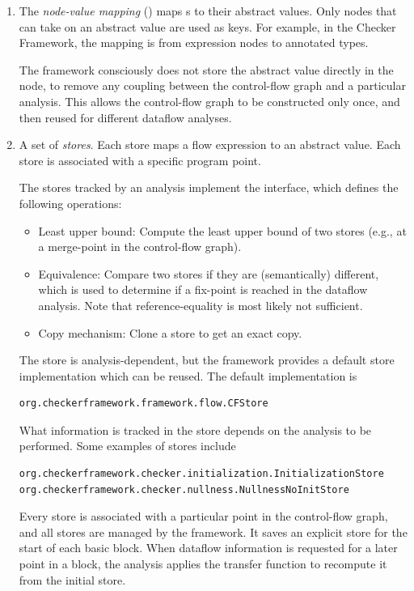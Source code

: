 \begin{enumerate}
\item
The \emph{node-value mapping} () maps s to their abstract
values.  Only nodes that can take on an abstract value are
used as keys.  For example, in the Checker Framework, the mapping is
from expression nodes to annotated types.

The framework consciously does not store the abstract value
directly in the node, to remove any coupling between the control-flow
graph and a particular analysis.  This allows the control-flow graph
to be constructed only once, and then reused for different dataflow
analyses.

\item
A set of \emph{stores}.  Each store maps a flow expression to an
abstract value.  Each store is associated with a specific program point.

The stores tracked by an analysis implement the 
interface, which defines the following operations:
\begin{itemize}
\item Least upper bound: Compute the least upper bound of two stores
  (e.g., at a merge-point in the control-flow graph).
\item Equivalence: Compare two stores if they are (semantically)
  different, which is used to determine if a fix-point is reached in
  the dataflow analysis. Note that reference-equality is most likely
  not sufficient.
\item Copy mechanism: Clone a store to get an exact copy.
\end{itemize}
The store is analysis-dependent, but the framework provides a default
store implementation which can be reused.  The default implementation
is
\begin{verbatim}org.checkerframework.framework.flow.CFStore\end{verbatim}

What information is tracked in the store depends on the analysis to be
 performed.  Some examples of stores include
\begin{verbatim}
org.checkerframework.checker.initialization.InitializationStore
org.checkerframework.checker.nullness.NullnessNoInitStore
\end{verbatim}

Every store is associated with a particular point in the control-flow
graph, and all stores are managed by the framework. It saves an explicit store
for the start of each basic block.
When dataflow information
is requested for a later point in a block, the analysis applies the
transfer function to recompute it from the initial store.

\end{enumerate}

